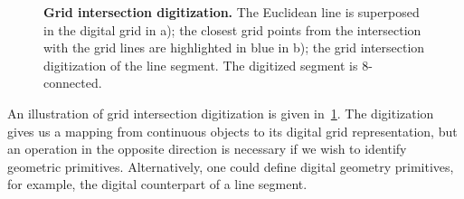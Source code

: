 \begin{figure}
{}
\caption{\textbf{Grid intersection digitization.} The Euclidean line is superposed in the digital grid in a); the closest grid points from the intersection with the grid lines are highlighted in blue in b); the grid intersection digitization of the line segment. The digitized segment is $8$-connected.}
\label{ch4:fig:grid-intersection-digitization}
\end{figure}

An illustration of grid intersection digitization is given in~\cref{ch4:fig:grid-intersection-digitization}. The digitization gives us a mapping from continuous objects to its digital grid representation, but an operation in the opposite direction is necessary if we wish to identify geometric primitives. Alternatively, one could define digital geometry primitives, for example, the digital counterpart of a line segment.

